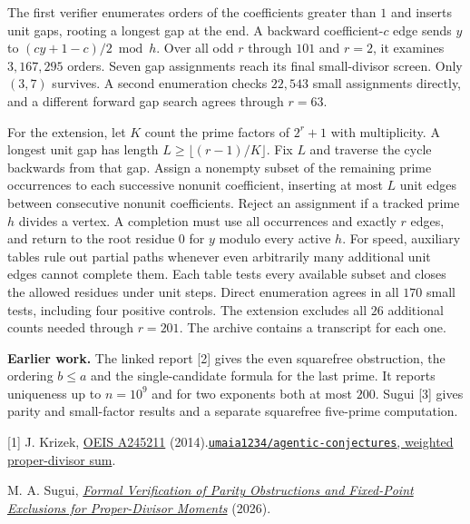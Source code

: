 \documentclass[12pt,letterpaper]{article}
\newcommand{\thm}[1]{\textbf{\color{ink}#1.}\enspace}
\newcommand{\Refe}[2]{\href{#1}{#2}}
\begin{document}
The first verifier enumerates orders of the coefficients greater than $1$ and inserts unit gaps, rooting a longest gap at the end. A backward coefficient-$c$ edge sends $y$ to $(cy+1-c)/2\bmod h$. Over all odd $r$ through $101$ and $r=2$, it examines $3{,}167{,}295$ orders. Seven gap assignments reach its final small-divisor screen. Only $(3,7)$ survives. A second enumeration checks $22{,}543$ small assignments directly, and a different forward gap search agrees through $r=63$.

For the extension, let $K$ count the prime factors of $2^r+1$ with multiplicity. A longest unit gap has length $L\ge\lfloor(r-1)/K\rfloor$. Fix $L$ and traverse the cycle backwards from that gap. Assign a nonempty subset of the remaining prime occurrences to each successive nonunit coefficient, inserting at most $L$ unit edges between consecutive nonunit coefficients. Reject an assignment if a tracked prime $h$ divides a vertex. A completion must use all occurrences and exactly $r$ edges, and return to the root residue $0$ for $y$ modulo every active $h$. For speed, auxiliary tables rule out partial paths whenever even arbitrarily many additional unit edges cannot complete them. Each table tests every available subset and closes the allowed residues under unit steps. Direct enumeration agrees in all $170$ small tests, including four positive controls. The extension excludes all $26$ additional counts needed through $r=201$. The archive contains a transcript for each one.

\thm{Earlier work} The linked report [2] gives the even squarefree obstruction, the ordering $b\le a$ and the single-candidate formula for the last prime. It reports uniqueness up to $n=10^9$ and for two exponents both at most $200$. Sugui [3] gives parity and small-factor results and a separate squarefree five-prime computation.
\par\small
[1] J. Krizek, \Refe{https://oeis.org/A245211}{OEIS A245211} (2014).\quad
[2] \Refe{https://github.com/umaia1234/agentic-conjectures/blob/78a56edb19eadb6a23f5f791273f016e0b3e0f50/problems/oeis-a245211/DETAILS.md}{\texttt{umaia1234/agentic-conjectures}, weighted proper-divisor sum}.\par
[3] M. A. Sugui, \Refe{https://doi.org/10.5281/zenodo.24437886}{\emph{Formal Verification of Parity Obstructions and Fixed-Point Exclusions for Proper-Divisor Moments}} (2026).
\end{document}

